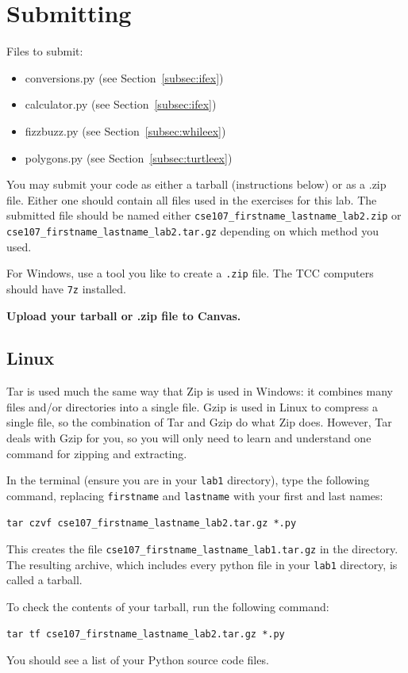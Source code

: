 \documentclass[11pt,hidelinks]{article}
\begin{document}
\pagebreak

\section{Submitting}

Files to submit:
\begin{itemize}
  \item conversions.py (see Section~\ref{subsec:ifex})
  \item calculator.py (see Section~\ref{subsec:ifex})
  \item fizzbuzz.py (see Section~\ref{subsec:whileex})
  \item polygons.py (see Section~\ref{subsec:turtleex})
\end{itemize}

You may submit your code as either a tarball (instructions below) or as a .zip
file. Either one should contain all files used in the exercises for this lab.
The submitted file should be named either
\texttt{cse107\_firstname\_lastname\_lab2.zip} or
\texttt{cse107\_firstname\_lastname\_lab2.tar.gz} depending on which method you
used.

For Windows, use a tool you like to create a \texttt{.zip} file. The TCC computers should
have \texttt{7z} installed.

\begin{center}
  \textbf{Upload your tarball or .zip file to Canvas.}
\end{center}

\subsection{Linux}

Tar is used much the same way that Zip is used in Windows: it combines many files and/or directories into a single file. Gzip is used in Linux to compress a single file, so the combination of Tar and Gzip do what Zip does. However, Tar deals with Gzip for you, so you will only need to learn and understand one command for zipping and extracting.

In the terminal (ensure you are in your \texttt{lab1} directory), type the following command, replacing \texttt{firstname} and \texttt{lastname} with your first and last names:

\begin{lstlisting}[style=bash]
tar czvf cse107_firstname_lastname_lab2.tar.gz *.py
\end{lstlisting}

This creates the file \texttt{cse107\_firstname\_lastname\_lab1.tar.gz} in the directory. The resulting archive, which includes every python file in your \texttt{lab1} directory, is called a tarball. 

To check the contents of your tarball, run the following command:

\begin{lstlisting}[style=bash]
tar tf cse107_firstname_lastname_lab2.tar.gz *.py
\end{lstlisting}

You should see a list of your Python source code files.
\end{document}
